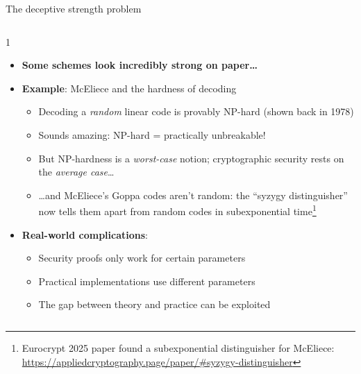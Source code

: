 \ifdefined\PRESENTATION\else\PassOptionsToClass{handout}{beamer}\fi\documentclass[aspectratio=169, lualatex]{beamer}
\begin{document}
\begin{frame}{The deceptive strength problem}
	\begin{columns}[c]
		\begin{column}{1\textwidth}
			\begin{itemize}
				\item \textbf{Some schemes look incredibly strong on paper\ldots}
				\item \textbf{Example}: McEliece and the hardness of decoding
				      \begin{itemize}
					      \item Decoding a \textit{random} linear code is provably NP-hard (shown back in 1978)
					      \item Sounds amazing: NP-hard = practically unbreakable!
					      \item But NP-hardness is a \textit{worst-case} notion; cryptographic security rests on the \textit{average case}\ldots
					      \item \ldots and McEliece's Goppa codes aren't random: the ``syzygy distinguisher'' now tells them apart from random codes in subexponential time\footnote{Eurocrypt 2025 paper found a subexponential distinguisher for McEliece: \url{https://appliedcryptography.page/paper/\#syzygy-distinguisher}}
				      \end{itemize}
				\item \textbf{Real-world complications}:
				      \begin{itemize}
					      \item Security proofs only work for certain parameters
					      \item Practical implementations use different parameters
					      \item The gap between theory and practice can be exploited
				      \end{itemize}
			\end{itemize}
		\end{column}
	\end{columns}
\end{frame}
\end{document}
